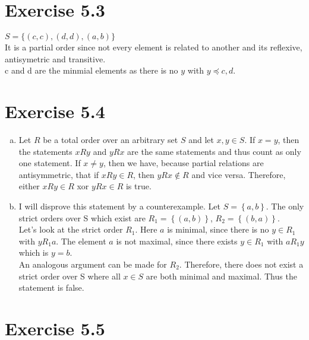 \documentclass{article} %
\newcommand{\homeworkNumber}{5}
\begin{document}
\section*{Exercise \homeworkNumber.3}
$S = \{(c,c),(d,d),(a,b)\}$ \\
It is a partial order since not every element is related to another and its reflexive, antisymetric and transitive. \\
c and d are the minmial elements as there is no $y$ with $ y \preceq c,d  $.


\section*{Exercise \homeworkNumber.4}

\begin{enumerate}[(a)]
	\item Let \( R \) be a total order over an arbitrary set \( S \) and let \( x,y \in S \).
	      If \( x = y \), then the statements \( xRy  \) and \( yRx \) are the same statements and thus count as only one statement.
	      If \( x \neq y \), then we have, because partial relations are antisymmetric, that if \( xRy \in R\), then \( yRx \not\in R\) and vice versa.
	      Therefore, either \( xRy \in R \) xor \( yRx \in R \) is true.
	\item I will disprove this statement by a counterexample.
	      Let \( S = \left\{ a,b \right\}  \).
	      The only strict orders over S which exist are \( R_{1} = \left\{ (a,b) \right\}  \), \( R_{2} = \left\{ (b, a) \right\}  \). \\
	      Let's look at the strict order \( R_{1} \).
	      Here \( a \) is minimal, since there is no \( y \in R_{1} \) with \( yR_{1}a \).
	      The element \( a \) is not maximal, since there exists \( y \in R_{1} \) with \( aR_{1}y \) which is \( y = b \). \\
	      An analogous argument can be made for \( R_{2} \).
	      Therefore, there does not exist a strict order over S where all \( x \in S \) are both minimal and maximal. Thus the statement is false.

\end{enumerate}


\section*{Exercise \homeworkNumber.5}
\end{document}
